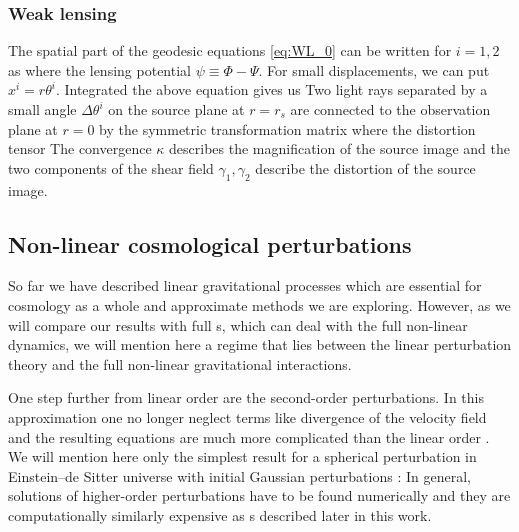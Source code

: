 \subsubsection{Weak lensing}
The spatial part of the geodesic equations \eqref{eq:WL_0} can be written for $i=1,2$ as
where the lensing potential $\psi\equiv\Phi-\Psi$. For small displacements, we can put $x^i=r\theta^i$. Integrated the above equation gives us
Two light rays separated by a small angle  $\Delta\theta^i$ on the source plane at $r=r_s$ are connected to the observation plane at $r=0$ by the symmetric transformation matrix
where the distortion tensor
The convergence $\kappa$ describes the magnification of the source image and the two components of the shear field $\gamma_1,\gamma_2$ describe the distortion of the source image.
\subsection{Non-linear cosmological perturbations}
So far we have described linear gravitational processes which are essential for cosmology as a whole and approximate methods we are exploring. However, as we will compare our results with full \nbodysim s, which can deal with the full non-linear dynamics, we will mention here a regime that lies between the linear perturbation theory and the full non-linear gravitational interactions.

One step further from linear order are the second-order perturbations. In this approximation one no longer neglect terms like divergence of the velocity field and the resulting equations are much more complicated than the linear order \textcite[see e.g.][]{2004astro.ph.12025T,10.1093/mnras/264.2.375,2010deto.book.....A}. We will mention here only the simplest result for a spherical perturbation in Einstein--de Sitter universe with initial Gaussian perturbations \textcite{1980_Peebles}:
In general, solutions of higher-order perturbations have to be found numerically and they are computationally similarly expensive as \nbodysim s described later in this work.

